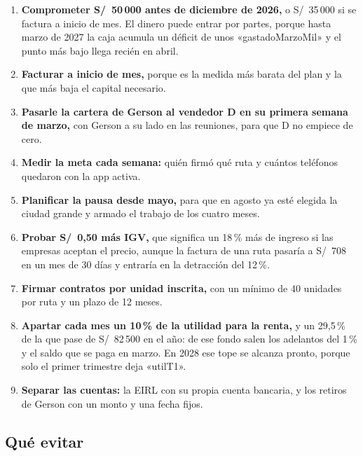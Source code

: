 \documentclass[10.5pt,a4paper]{article}
\begin{document}
\begin{enumerate}
\item \textbf{Comprometer S/~50\,000 antes de diciembre de 2026,} o S/~35\,000 si se factura a inicio de mes. El dinero puede entrar por partes, porque hasta marzo de 2027 la caja acumula un déficit de unos «gastadoMarzoMil» y el punto más bajo llega recién en abril.
\item \textbf{Facturar a inicio de mes,} porque es la medida más barata del plan y la que más baja el capital necesario.
\item \textbf{Pasarle la cartera de Gerson al vendedor D en su primera semana de marzo,} con Gerson a su lado en las reuniones, para que D no empiece de cero.
\item \textbf{Medir la meta cada semana:} quién firmó qué ruta y cuántos teléfonos quedaron con la app activa.
\item \textbf{Planificar la pausa desde mayo,} para que en agosto ya esté elegida la ciudad grande y armado el trabajo de los cuatro meses.
\item \textbf{Probar S/~0,50 más IGV,} que significa un 18\,\% más de ingreso si las empresas aceptan el precio, aunque la factura de una ruta pasaría a S/~708 en un mes de 30 días y entraría en la detracción del 12\,\%.
\item \textbf{Firmar contratos por unidad inscrita,} con un mínimo de 40 unidades por ruta y un plazo de 12 meses.
\item \textbf{Apartar cada mes un 10\,\% de la utilidad para la renta,} y un 29,5\,\% de la que pase de S/~82\,500 en el año: de ese fondo salen los adelantos del 1\,\% y el saldo que se paga en marzo. En 2028 ese tope se alcanza pronto, porque solo el primer trimestre deja «utilT1».
\item \textbf{Separar las cuentas:} la EIRL con su propia cuenta bancaria, y los retiros de Gerson con un monto y una fecha fijos.
\end{enumerate}

\subsection{Qué evitar}
\end{document}
